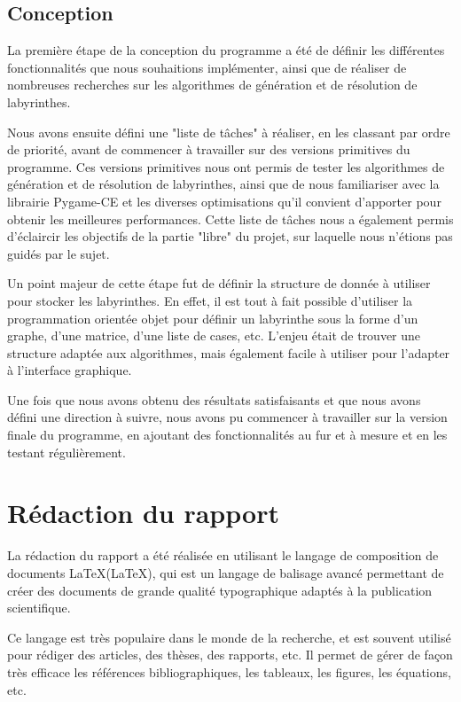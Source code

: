 \documentclass[12pt]{scrreprt} %
\begin{document}
\subsection{Conception}

La première étape de la conception du programme a été de définir les différentes fonctionnalités que nous souhaitions implémenter, ainsi que de réaliser de nombreuses recherches sur les algorithmes de génération et de résolution de labyrinthes.

Nous avons ensuite défini une "liste de tâches" à réaliser, en les classant par ordre de priorité, avant de commencer à travailler sur des versions primitives du programme. Ces versions primitives nous ont permis de tester les algorithmes de génération et de résolution de labyrinthes, ainsi que de nous familiariser avec la librairie Pygame-CE et les diverses optimisations qu'il convient d'apporter pour obtenir les meilleures performances. Cette liste de tâches nous a également permis d'éclaircir les objectifs de la partie "libre" du projet, sur laquelle nous n'étions pas guidés par le sujet.

Un point majeur de cette étape fut de définir la structure de donnée à utiliser pour stocker les labyrinthes. En effet, il est tout à fait possible d'utiliser la programmation orientée objet pour définir un labyrinthe sous la forme d'un graphe, d'une matrice, d'une liste de cases, etc. L'enjeu était de trouver une structure adaptée aux algorithmes, mais également facile à utiliser pour l'adapter à l'interface graphique.

Une fois que nous avons obtenu des résultats satisfaisants et que nous avons défini une direction à suivre, nous avons pu commencer à travailler sur la version finale du programme, en ajoutant des fonctionnalités au fur et à mesure et en les testant régulièrement.

\section{Rédaction du rapport}

La rédaction du rapport a été réalisée en utilisant le langage de composition de documents \LaTeX (LaTeX), qui est un langage de balisage  avancé permettant de créer des documents de grande qualité typographique adaptés à la publication scientifique.

Ce langage est très populaire dans le monde de la recherche, et est souvent utilisé pour rédiger des articles, des thèses, des rapports, etc. Il permet de gérer de façon très efficace les références bibliographiques, les tableaux, les figures, les équations, etc.
\end{document}
